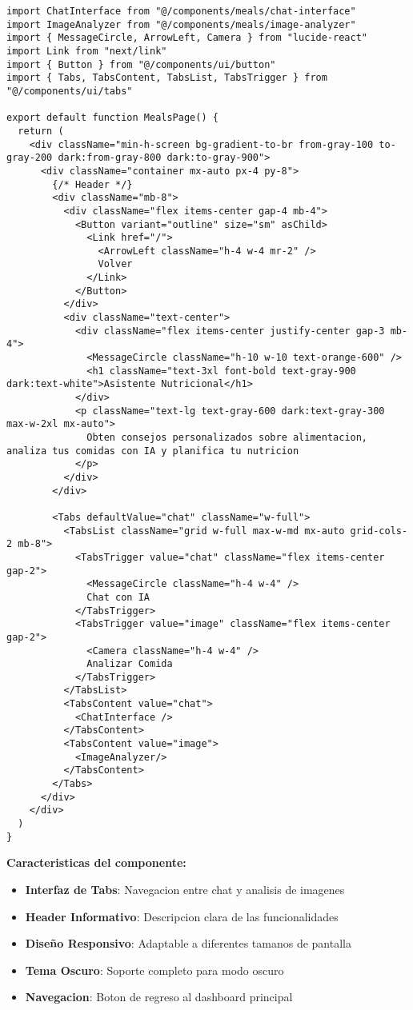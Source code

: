 \documentclass[12pt,a4paper]{article}
\begin{document}
\begin{lstlisting}[caption=app/meals/page.tsx - Estructura completa]
import ChatInterface from "@/components/meals/chat-interface"
import ImageAnalyzer from "@/components/meals/image-analyzer"
import { MessageCircle, ArrowLeft, Camera } from "lucide-react"
import Link from "next/link"
import { Button } from "@/components/ui/button"
import { Tabs, TabsContent, TabsList, TabsTrigger } from "@/components/ui/tabs"

export default function MealsPage() {
  return (
    <div className="min-h-screen bg-gradient-to-br from-gray-100 to-gray-200 dark:from-gray-800 dark:to-gray-900">
      <div className="container mx-auto px-4 py-8">
        {/* Header */}
        <div className="mb-8">
          <div className="flex items-center gap-4 mb-4">
            <Button variant="outline" size="sm" asChild>
              <Link href="/">
                <ArrowLeft className="h-4 w-4 mr-2" />
                Volver
              </Link>
            </Button>
          </div>
          <div className="text-center">
            <div className="flex items-center justify-center gap-3 mb-4">
              <MessageCircle className="h-10 w-10 text-orange-600" />
              <h1 className="text-3xl font-bold text-gray-900 dark:text-white">Asistente Nutricional</h1>
            </div>
            <p className="text-lg text-gray-600 dark:text-gray-300 max-w-2xl mx-auto">
              Obten consejos personalizados sobre alimentacion, analiza tus comidas con IA y planifica tu nutricion
            </p>
          </div>
        </div>

        <Tabs defaultValue="chat" className="w-full">
          <TabsList className="grid w-full max-w-md mx-auto grid-cols-2 mb-8">
            <TabsTrigger value="chat" className="flex items-center gap-2">
              <MessageCircle className="h-4 w-4" />
              Chat con IA
            </TabsTrigger>
            <TabsTrigger value="image" className="flex items-center gap-2">
              <Camera className="h-4 w-4" />
              Analizar Comida
            </TabsTrigger>
          </TabsList>
          <TabsContent value="chat">
            <ChatInterface />
          </TabsContent>
          <TabsContent value="image">
            <ImageAnalyzer/>
          </TabsContent>
        </Tabs>
      </div>
    </div>
  )
}
\end{lstlisting}

\textbf{Caracteristicas del componente:}
\begin{itemize}
    \item \textbf{Interfaz de Tabs}: Navegacion entre chat y analisis de imagenes
    \item \textbf{Header Informativo}: Descripcion clara de las funcionalidades
    \item \textbf{Diseño Responsivo}: Adaptable a diferentes tamanos de pantalla
    \item \textbf{Tema Oscuro}: Soporte completo para modo oscuro
    \item \textbf{Navegacion}: Boton de regreso al dashboard principal
\end{itemize}
\end{document}
